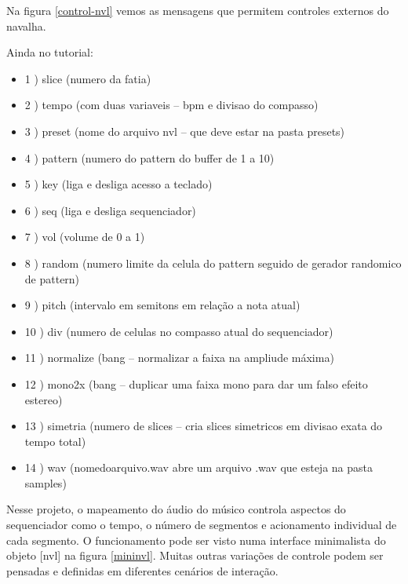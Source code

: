 \documentclass{ppgmus}
\begin{document}
Na figura \ref{control-nvl} vemos as mensagens que permitem controles externos do navalha.

Ainda no tutorial:

\begin{itemize}
\item 1 ) slice (numero da fatia) 
\item 2 ) tempo (com duas variaveis – bpm e divisao do compasso)
\item 3 ) preset (nome do arquivo nvl – que deve estar na pasta presets)
\item 4 ) pattern (numero do pattern do buffer de 1 a 10)
\item 5 ) key (liga e desliga acesso a teclado)
\item 6 ) seq (liga e desliga sequenciador)
\item 7 ) vol (volume de 0 a 1)
\item 8 ) random (numero limite da celula do pattern seguido de gerador randomico de pattern)
\item 9 ) pitch (intervalo em semitons em relação a nota atual)
\item 10 ) div (numero de celulas no compasso atual do sequenciador)
\item 11 ) normalize (bang – normalizar a faixa na ampliude máxima)
\item 12 ) mono2x (bang – duplicar uma faixa mono para dar um falso efeito estereo)
\item 13 ) simetria (numero de slices – cria slices simetricos em divisao exata do tempo total)
\item 14 ) wav (nomedoarquivo.wav abre um arquivo .wav que esteja na pasta samples)
\end{itemize}


Nesse projeto, o mapeamento do áudio do músico controla aspectos do sequenciador como o tempo,
o número de segmentos e acionamento individual de cada segmento. O funcionamento
pode ser visto numa interface minimalista do objeto [nvl] na figura \ref{mininvl}.
Muitas outras variações de controle podem
ser pensadas e definidas em diferentes cenários de interação.






% 
% 
% 
% 
% 
% 
% 
% 
% 
% 
\end{document}
